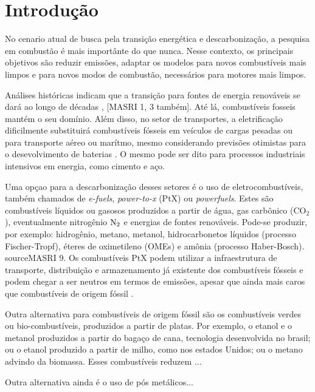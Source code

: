 \section{Introdução}


No cenario atual de busca pela transição energética e descarbonização, a pesquisa em combustão é mais importânte do que nunca.
Nesse contexto, os principais objetivos são reduzir emissões, adaptar os modelos para novos combustíveis mais limpos e para novos modos de combustão, necessários para motores mais limpos.

Análises históricas indicam que a transição para fontes de energia renováveis se dará ao longo de décadas \cite{MasriA2021}, [MASRI 1, 3 também]. Até lá, combustíveis fosseis mantém o seu domínio.
Além disso, no setor de transportes, a eletrificação dificilmente substituirá combustíveis fósseis em veículos de cargas pesadas ou para transporte aéreo ou marítmo, mesmo considerando previsões otimistas para o desevolvimento de baterias \cite{MasriA2021}. O mesmo pode ser dito para processos industriais intensivos em energia, como cimento e aço.

Uma opçao para a descarbonização desses setores é o uso de eletrocombustíveis, também chamados de \emph{e-fuels}, \emph{power-to-x} (PtX) ou \emph{powerfuels}.
Estes são combustíveis líquidos ou gasosos produzidos a partir de água, gas carbônico ($\text{CO}_2$), eventualmente nitrogênio $\text N_2$ e energias de fontes renováveis. 
Pode-se produzir, por exemplo: hidrogênio, metano, metanol, hidrocarbonetos líquidos (processo Fischer-Tropf), éteres de oximetileno (OMEs) e amônia (processo Haber-Bosch). source{MASRI 9}.
Os combustíveis PtX podem utilizar a infraestrutura de transporte, distribuição e armazenamento já existente dos combustíveis fósseis  e podem chegar a ser neutros em termos de emissões, apesar que ainda mais caros que combustíveis de origem fóssil . 

Outra alternativa para combustíveis de origem fóssil são os combustíveis verdes ou bio-combustíveis, produzidos a partir de platas. 
Por exemplo, o etanol e o metanol produzidos a partir do bagaço de cana, tecnologia desenvolvida no brasil; ou o etanol produzido a partir de milho, como nos estados Unidos; ou o metano advindo da biomassa. \source
Esses combustíveis reduzem  ...

Outra alternativa ainda é o uso de pós metálicos...




